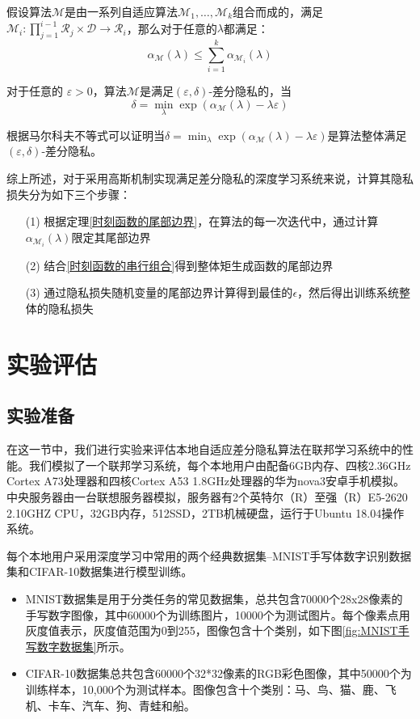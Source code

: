\begin{theorem}[时刻函数的串行组合]\label{时刻函数的串行组合}
假设算法$\mathcal{M}$是由一系列自适应算法$\mathcal{M}_{1}, \ldots, \mathcal{M}_{k}$组合而成的，满足$\mathcal{M}_{i}: \prod_{j=1}^{i-1} \mathcal{R}_{j} \times \mathcal{D} \rightarrow \mathcal{R}_{i}$，那么对于任意的$\lambda$都满足：
$$
\alpha_{\mathcal{M}}(\lambda) \leq \sum_{i=1}^{k} \alpha_{\mathcal{M}_{i}}(\lambda)
$$
\end{theorem}

\begin{theorem}[时刻函数的尾部边界]\label{时刻函数的尾部边界}
对于任意的 $\varepsilon>0$，算法$\mathcal{M}$是满足$(\varepsilon, \delta)$-差分隐私的，当
$$
\delta=\min _{\lambda} \exp \left(\alpha_{\mathcal{M}}(\lambda)-\lambda \varepsilon\right)
$$
\end{theorem}

根据马尔科夫不等式可以证明当$\delta=\min _{\lambda} \exp \left(\alpha_{\mathcal{M}}(\lambda)-\lambda \varepsilon\right)$是算法整体满足$(\varepsilon, \delta)$-差分隐私。

综上所述，对于采用高斯机制实现满足差分隐私的深度学习系统来说，计算其隐私损失分为如下三个步骤：
\begin{enumerate}
\item [(1)] 根据定理\ref{时刻函数的尾部边界}，在算法的每一次迭代中，通过计算$\alpha_{\mathcal{M}_{i}}(\lambda)$限定其尾部边界
\item [(2)] 结合\ref{时刻函数的串行组合}得到整体矩生成函数的尾部边界
\item [(3)] 通过隐私损失随机变量的尾部边界计算得到最佳的$\epsilon$，然后得出训练系统整体的隐私损失
\end{enumerate}


\section{实验评估}
\subsection{实验准备}
在这一节中，我们进行实验来评估本地自适应差分隐私算法在联邦学习系统中的性能。我们模拟了一个联邦学习系统，每个本地用户由配备6GB内存、四核2.36GHz Cortex A73处理器和四核Cortex A53 1.8GHz处理器的华为nova3安卓手机模拟。中央服务器由一台联想服务器模拟，服务器有2个英特尔（R）至强（R）E5-2620 2.10GHZ CPU，32GB内存，512SSD，2TB机械硬盘，运行于Ubuntu 18.04操作系统。

每个本地用户采用深度学习中常用的两个经典数据集--MNIST手写体数字识别数据集和CIFAR-10数据集进行模型训练。
\begin{itemize}
\item MNIST数据集是用于分类任务的常见数据集，总共包含70000个28x28像素的手写数字图像，其中60000个为训练图片，10000个为测试图片。每个像素点用灰度值表示，灰度值范围为0到255，图像包含十个类别，如下图\ref{fig:MNIST手写数字数据集}所示。

\item CIFAR-10数据集总共包含60000个32*32像素的RGB彩色图像，其中50000个为训练样本，10,000个为测试样本。图像包含十个类别：马、鸟、猫、鹿、飞机、卡车、汽车、狗、青蛙和船。

\end{itemize}

